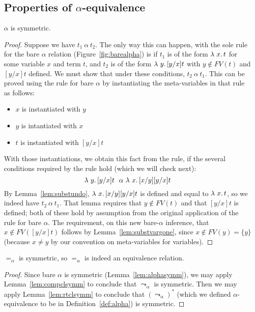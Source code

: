\subsection{Properties of $\alpha$-equivalence}

\begin{lemma}
\label{lem:alphasymm}
  $\alpha$ is symmetric.
\end{lemma}
\begin{proof} Suppose we have $t_1\ \alpha\ t_2$.  The only way this can happen,
  with the sole rule for the bare $\alpha$ relation (Figure~\ref{fig:barealpha})
  is if $t_1$ is of the form $\lambda\ x.\, t$ for some variable $x$ and term $t$, and $t_2$
  is of the form $\lambda\ y.\, [y/x]t$ with $y\not\in\textit{FV}(t)$ and $[y/x]t$ defined.
  We must show that under these conditions, $t_2\ \alpha\ t_1$.  This can be proved
  using the rule for bare $\alpha$ by instantiating the meta-variables in that rule
  as follows:
  \begin{itemize}
  \item $x$ is instantiated with $y$
  \item $y$ is intantiated with $x$
  \item $t$ is instantiated with $[y/x]t$
  \end{itemize}
  \noindent With those instantiations, we obtain this fact from the rule, if the
  several conditions required by the rule hold (which we will check next):
  \[
  \lam{y}{[y/x]t}\ \ \alpha\ \lam{x}{[x/y][y/x]t}
  \]
  \noindent By Lemma~\ref{lem:substundo}, $\lambda\ x.\, [x/y][y/x]t$ is defined and equal to $\lambda\ x.\, t$,
  so we indeed have $t_2\ \alpha\ t_1$.  That lemma requires that $y\not\in\textit{FV}(t)$ and that $[y/x]t$ is defined; both
  of these hold by assumption from the original application of the rule for bare $\alpha$.  The requirement, on this
  new bare-$\alpha$ inference, that $x\not\in\textit{FV}([y/x]t)$ follows
  by Lemma~\ref{lem:substvargone}, since $x\not\in\textit{FV}(y) = \{y\}$ (because $x\neq y$
  by our convention on meta-variables for variables).

  \end{proof}


\begin{corollary}
  $=_\alpha$ is symmetric, so $=_\alpha$ is indeed an equivalence relation.
\end{corollary}
\begin{proof}
  Since bare $\alpha$ is symmetric (Lemma~\ref{lem:alphasymm}), we may apply Lemma~\ref{lem:compclsymm} to conclude
  that $\leadsto_\alpha$ is symmetric.  Then we may apply Lemma~\ref{lem:rtclsymm} to conclude that $(\leadsto_\alpha)^*$ (which
  we defined $\alpha$-equivalence to be in Definition~\ref{def:alpha}) is
  symmetric.
\end{proof}


